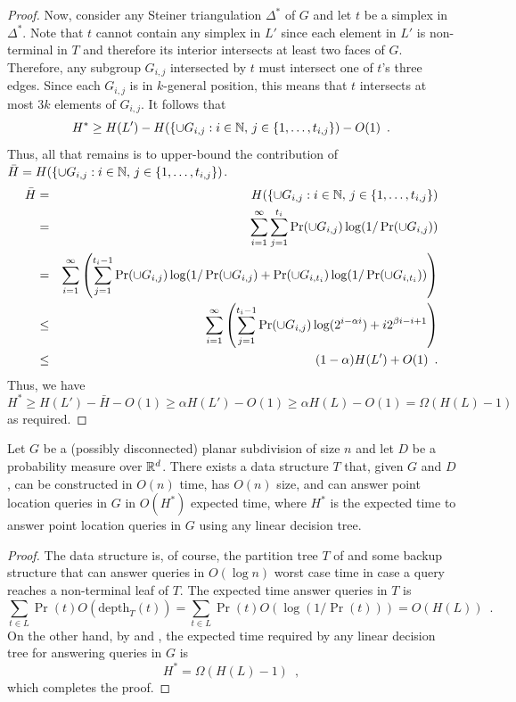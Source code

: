 \documentclass{patmorin}
\newcommand{\depth}{\mathrm{depth}}
\begin{document}
\begin{proof}
  Now, consider any Steiner triangulation $\Delta^*$ of $G$ and let
  $t$ be a simplex in $\Delta^*$.  Note that $t$ cannot contain any
  simplex in $L'$ since each element in $L'$ is non-terminal in $T$
  and therefore its interior intersects at least two faces of $G$.
  Therefore, any subgroup $G_{i,j}$ intersected by $t$ must intersect one
  of $t$'s three edges. Since each $G_{i,j}$ is in $k$-general position,
  this means that $t$ intersects at most $3k$ elements of $G_{i,j}$.
  It follows \cite[Lemma~3]{cdilm09} that
  \[
    H^* \ge H(L') 
       - H(\{\cup G_{i,j}:i\in\mathbb{N},\, j \in\{1,\ldots,t_{i,j}\}) 
       - O(1) \enspace .
  \]
  Thus, all that remains is to upper-bound the contribution of $\bar{H}=H(\{\cup G_{i,j}:i\in\mathbb{N},\, j \in\{1,\ldots,t_{i,j}\})$.
  \begin{eqnarray*}
    \bar{H} &= & H(\{\cup G_{i,j}:i\in\mathbb{N},\, j \in\{1,\ldots,t_{i,j}\}) \\
     & = & \sum_{i=1}^\infty \sum_{j=1}^{t_{i}} 
         \Pr(\cup G_{i,j})\log(1/\Pr(\cup G_{i,j})) \\
   & = & \sum_{i=1}^\infty
        \left( 
          \sum_{j=1}^{t_{i}-1} 
             \Pr(\cup G_{i,j})\log(1/\Pr(\cup G_{i,j}) 
             + \Pr(\cup G_{i,t_i})\log(1/\Pr(\cup G_{i,t_i}))
        \right) \\
   & \le & \sum_{i=1}^\infty
        \left( 
          \sum_{j=1}^{t_{i}-1} 
             \Pr(\cup G_{i,j})\log(2^{i-\alpha i})
             + i 2^{\beta i - i + 1}
        \right) \\
    & \le & (1-\alpha)H(L') + O(1) \enspace .
  \end{eqnarray*}
  Thus, we have 
  \[  
     H^* \ge H(L') - \bar{H} -O(1) \ge \alpha H(L') - O(1) 
         \ge \alpha H(L) - O(1) = \Omega(H(L) - 1) 
  \]
  as required.
\end{proof}

\begin{thm}
  Let $G$ be a (possibly disconnected) planar subdivision of size $n$
  and let $D$ be a probability measure over $\mathbb{R}^d$.  There exists a data
  structure $T$ that, given $G$ and $D$, can be constructed in $O(n)$
  time, has $O(n)$ size, and can answer point location queries in $G$
  in $O(H^*)$ expected time, where $H^*$ is the expected time to answer
  point location queries in $G$ using any linear decision tree.
\end{thm}

\begin{proof}
  The data structure is, of course, the partition tree $T$ of
   and some backup structure that can answer
  queries in $O(\log n)$ worst case time in case a query reaches a
  non-terminal leaf of $T$.  The expected time answer queries in $T$ is
  \[
     \sum_{t\in L} \Pr(t)O(\depth_T(t)) = \sum_{t\in L}\Pr(t)O(\log(1/\Pr(t))) = O(H(L)) \enspace .
  \]
  On the other hand, by  and ,
  the expected time required by any linear decision tree for answering
  queries in $G$ is
  \[
      H^* = \Omega(H(L) - 1) \enspace ,
  \]
  which completes the proof.
\end{proof}
\end{document}

